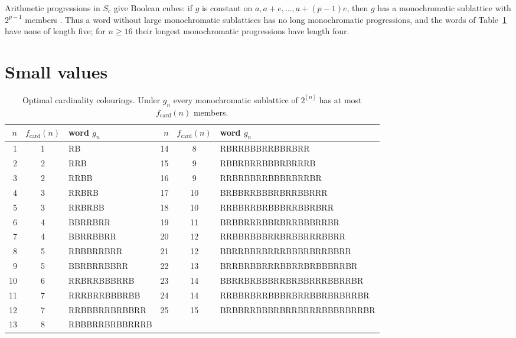 \documentclass[11pt,reqno]{amsart}
\numberwithin{equation}{section}
\theoremstyle{plain}
\theoremstyle{definition}
\theoremstyle{remark}
\newcommand{\fc}{f_{\mathrm{card}}}
\newcommand{\w}[1]{\textsf{\upshape #1}}
\begin{document}
Arithmetic progressions in $S_c$ give Boolean cubes: if $g$ is constant on
$a,a+e,\dots,a+(p-1)e$, then $g$ has a monochromatic sublattice with
$2^{p-1}$ members \cite[Proposition~6.2]{BMB26v5}. Thus a word without
large monochromatic sublattices has no long monochromatic progressions,
and the words of Table~\ref{tab:words} have none of length five; for
$n\ge16$ their longest monochromatic progressions have length four.

\section{Small values}
\label{sec:small}

\begin{table}[t]
\centering
\scriptsize
\setlength{\tabcolsep}{3pt}
\renewcommand{\arraystretch}{1.08}
\begin{tabular}{@{}rcl@{\quad}rcl@{}}
\toprule
$n$ & $\fc(n)$ & word $g_n$ & $n$ & $\fc(n)$ & word $g_n$\\
\midrule
1 & 1 & \w{RB} & 14 & 8 & \w{RBRRBBBRRBBRBRR}\\
2 & 2 & \w{RRB} & 15 & 9 & \w{RBBRBRRBBBRBRRRB}\\
3 & 2 & \w{RRBB} & 16 & 9 & \w{RRBRBBRRBBBRBRRBR}\\
4 & 3 & \w{RRBRB} & 17 & 10 & \w{BRBBRRBBBRBRRBBRRR}\\
5 & 3 & \w{RRBRBB} & 18 & 10 & \w{RRBBRRBRBBBRRBBRBRR}\\
6 & 4 & \w{BBRRBRR} & 19 & 11 & \w{BRBBRRRBBRBRRBBBRRBR}\\
7 & 4 & \w{BBRRBBRR} & 20 & 12 & \w{RRBBRBBBRRBRBBRRRBBRR}\\
8 & 5 & \w{RBBBRRBRR} & 21 & 12 & \w{BBRRBBRBRRRBBBRBRRBBRR}\\
9 & 5 & \w{BBRBRRBBRR} & 22 & 13 & \w{BRRBRBBRRRBBRRBRBBBRRBR}\\
10 & 6 & \w{RRBRRBBBRRB} & 23 & 14 & \w{BBRRBRBBBRRBRBBRRRBBRRBR}\\
11 & 7 & \w{RRRBRRBBBRBB} & 24 & 14 & \w{RRBBRBRRBBBRBRRBBRBRBRRBR}\\
12 & 7 & \w{RRBBBRRBRBBRR} & 25 & 15 & \w{BRBBRRBBBRBRRBRRRBBBRBRRBR}\\
13 & 8 & \w{RBBBRRBRBBRRRB} &  &  & \\
\bottomrule
\end{tabular}
\medskip
\caption{Optimal cardinality colourings. Under $g_n$ every monochromatic
sublattice of $2^{[n]}$ has at most $\fc(n)$ members.}
\label{tab:words}
\end{table}
\end{document}
